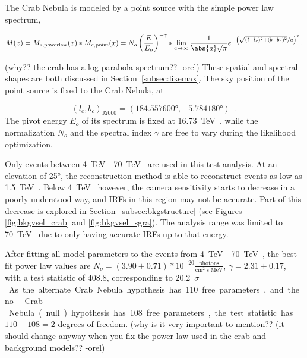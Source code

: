   The Crab Nebula is modeled by a point source with the simple power law spectrum,

  \begin{equation}\label{eqn:crab_model}
    M(\xtrue) = M_{s,\textrm{powerlaw}}(\xtrue) * M_{e,\textrm{point}}(\xtrue) = N_o \left ( \frac{\Etrue}{E_o} \right )^{-\gamma} * \lim_{a\to\infty} \frac{1}{ \abs{a} \sqrt{\pi} } e^{ - \left ( \sqrt{ (\ltrue-l_c)^2 + (\btrue-b_c)^2 }/a \right )^2 } \,.
  \end{equation}

  {\color{red}(why?? the crab has a log parabola spectrum?? -orel)}
  These spatial and spectral shapes are both discussed in Section~\ref{subsec:likemax}.
  The sky position of the point source is fixed to the Crab Nebula, at

  $$(l_c,b_c)_{\textrm{J2000}} = (\ang{184.557600},\ang{-5.784180}) \;\;.$$
  The pivot energy $E_o$ of its spectrum is fixed at \SI{16.73}{\TeV{}}, while the normalization $N_o$ and the spectral index $\gamma$ are free to vary during the likelihood optimization.
  
  Only events between \SIrange{4}{70}{\TeV{}} are used in this test analysis.
  At an elevation of \ang{25}, the reconstruction method is able to reconstruct events as low as \SI{1.5}{\TeV{}}.
  Below \SI{4}{\TeV{}} however, the camera sensitivity starts to decrease in a poorly understood way, and IRFs in this region may not be accurate.
  Part of this decrease is explored in Section~\ref{subsec:bkgstructure} (see Figures \ref{fig:bkgvsel_crab} and \ref{fig:bkgvsel_sgra}).
  The analysis range was limited to \SI{70}{\TeV{}} due to only having accurate IRFs up to that energy.
    
  After fitting all model parameters to the events from \SIrange{4}{70}{\TeV{}}, the best fit power law values are $ N_o = \left(3.90\pm0.71\right)*10^{-20} \frac{\textrm{photons}}{\textrm{cm}^{2} \; \textrm{s} \; \textrm{MeV} } $, $ \gamma = 2.31 \pm 0.17 $, with a test statistic of 408.8, corresponding to \nicetilde{}\SI{20.2}{$\sigma$}.
  As the alternate Crab Nebula hypothesis has 110 free parameters, and the no-Crab-Nebula (null) hypothesis has 108 free parameters, the test statistic has $ 110 - 108 = 2 $ degrees of freedom.
  {\color{red}(why is it very important to mention?? (it should change anyway when you fix the power law used in the crab and background models?? -orel)}
  
